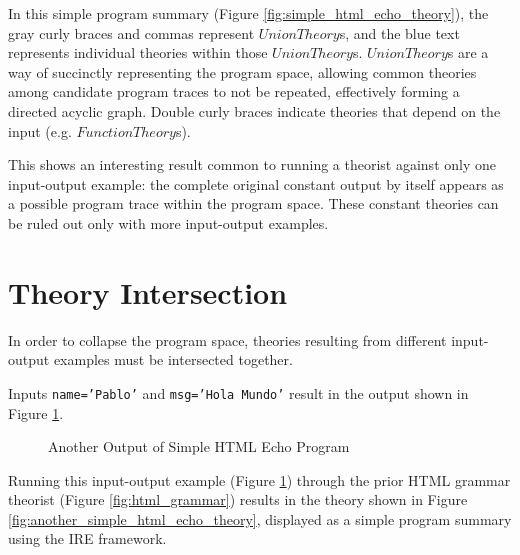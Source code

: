 In this simple program summary (Figure \ref{fig:simple_html_echo_theory}), the gray curly braces and commas represent $UnionTheory$s, and the blue text represents individual theories within those $UnionTheory$s.
$UnionTheory$s are a way of succinctly representing the program space, allowing common theories among candidate program traces to not be repeated, effectively forming a directed acyclic graph.
Double curly braces indicate theories that depend on the input (e.g. $FunctionTheory$s).

This shows an interesting result common to running a theorist against only one input-output example: the complete original constant output by itself appears as a possible program trace within the program space.
These constant theories can be ruled out only with more input-output examples.

\section{Theory Intersection}
\label{sec:theory_intersection}

In order to collapse the program space, theories resulting from different input-output examples must be intersected together.


Inputs \texttt{name='Pablo'} and \texttt{msg='Hola Mundo'} result in the output shown in Figure \ref{fig:another_output_of_simple_html_echo_program}.

\begin{figure}[tb]
\caption{Another Output of Simple HTML Echo Program}
\label{fig:another_output_of_simple_html_echo_program}
\end{figure}

Running this input-output example (Figure \ref{fig:another_output_of_simple_html_echo_program}) through the prior HTML grammar theorist (Figure \ref{fig:html_grammar}) results in the theory shown in Figure \ref{fig:another_simple_html_echo_theory}, displayed as a simple program summary using the IRE framework.

